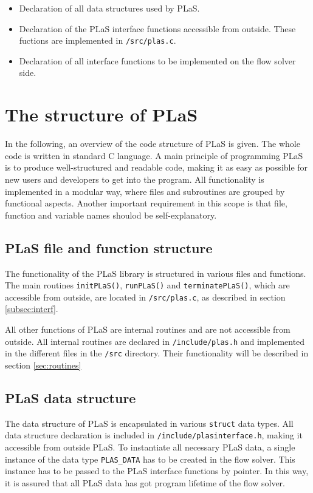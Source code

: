 \documentclass[12pt]{article}
\begin{document}
\begin{itemize}
\item Declaration of all data structures used by PLaS.
\item Declaration of the PLaS interface functions accessible from outside. These fuctions are implemented in {\tt{/src/plas.c}}.
\item Declaration of all interface functions to be implemented on the flow solver side.
\end{itemize}

\newpage
\section{The structure of PLaS}
\label{sec:structure}

In the following, an overview of the code structure of PLaS is given. The whole code is written in standard C language. A main principle of programming PLaS is to produce well-structured and readable code, making it as easy as possible for new users and developers to get into the program. All functionality is implemented in a modular way, where files and subroutines are grouped by functional aspects. Another important requirement in this scope is that file, function and variable names shoulod be self-explanatory.

\subsection{PLaS file and function structure}
\label{subsec:filefunc}

The functionality of the PLaS library is structured in various files and functions. The main routines {\tt{initPLaS()}}, {\tt{runPLaS()}} and {\tt{terminatePLaS()}}, which are accessible from outside, are located in {\tt{/src/plas.c}}, as described in section \ref{subsec:interf}.

All other functions of PLaS are internal routines and are not accessible from outside. All internal routines are declared in {\tt{/include/plas.h}} and implemented in the different files in the {\tt{/src}} directory. Their functionality will be described in section \ref{sec:routines}

\subsection{PLaS data structure}
\label{subsec:datastruct}

The data structure of PLaS is encapsulated in various {\tt{struct}} data types. All data structure declaration is included in {\tt{/include/plasinterface.h}}, making it accessible from outside PLaS. To instantiate all necessary PLaS data, a single instance of the data type {\tt{PLAS\_DATA}} has to be created in the flow solver. This instance has to be passed to the PLaS interface functions by pointer. In this way, it is assured that all PLaS data has got program lifetime of the flow solver.
\end{document}
